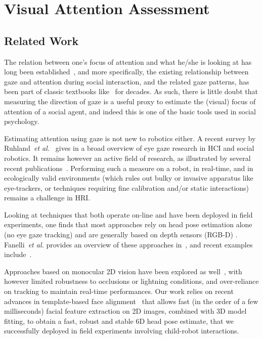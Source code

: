 \documentclass{sig-alternate}
\newcommand{\etal}{\textit{et al.}\xspace}
\begin{document}

\section{Visual Attention Assessment}
\label{sec:vfoa}

\subsection{Related Work}

The relation between one's focus of attention and what he/she is looking at has
long been established~\cite{yarbus1967eye,barber1976perception}, and more
specifically, the existing relationship between gaze and attention during social
interaction, and the related gaze patterns, has been part of classic textbooks
like~\cite{argyle1969social} for decades. As such, there is little doubt that
measuring the direction of gaze is a useful proxy to estimate the (visual) focus
of attention of a social agent, and indeed this is one of the basic tools used
in social psychology.

Estimating attention using gaze is not new to robotics either. A recent survey
by Ruhland~\etal~\cite{ruhland2015review} gives in a broad overview of eye gaze
research in HCI and social robotics. It remains however an active field of
research, as illustrated by several recent
publications~\cite{baxter2014tracking,anzalone,kennedy2015head}.  Performing
such a measure on a robot, in real-time, and in ecologically valid environments
(which rules out bulky or invasive apparatus like eye-trackers, or techniques
requiring fine calibration and/or static interactions) remains a challenge in
HRI.

Looking at techniques that both operate on-line and have been deployed in field
experiments, one finds that most approaches rely on head pose estimation alone
(no eye gaze tracking) and are generally based on depth sensors (RGB-D) .
Fanelli~\etal provides an overview of these approaches
in~\cite{fanelli2012real}, and recent examples include~\cite{baxter2014tracking,
anzalone}.

Approaches based on monocular 2D vision have been explored as
well~\cite{peters2010investigating}, with however limited robustness to
occlusions or lightning conditions, and over-reliance on tracking to maintain
real-time performances.  Our work relies on recent advances in template-based
face alignment~\cite{kazemi2014one} that allows fast (in the order of a few
milliseconds) facial feature extraction on 2D images, combined with 3D model
fitting, to obtain a fast, robust and stable 6D head pose estimate, that we
successfully deployed in field experiments involving child-robot interactions.
\end{document}
